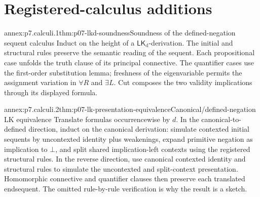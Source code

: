 
\section{Registered-calculus additions}

\begin{annexitem}{annex:p7.calculi.1}{thm:p07-lkd-soundness}{Soundness of the defined-negation sequent calculus}
Induct on the height of a
\(\mathsf{LK}_{\mathrm d}\)-derivation.  The initial and structural rules
preserve the semantic reading of the sequent.  Each propositional case unfolds
the truth clause of its principal connective.  The quantifier cases use the
first-order substitution lemma; freshness of the eigenvariable permits the
assignment variation in \(\forall R\) and \(\exists L\).  Cut composes the
two validity implications through its displayed formula.
\end{annexitem}

\begin{annexitem}{annex:p7.calculi.2}{thm:p07-lk-presentation-equivalence}{Canonical/defined-negation LK equivalence}
Translate formulas occurrencewise by \(d\).  In the canonical-to-defined
direction, induct on the canonical derivation: simulate contexted initial
sequents by uncontexted identity plus weakenings, expand primitive negation as
implication to \(\bot\), and split shared implication-left contexts using the
registered structural rules.  In the reverse direction, use canonical
contexted identity and structural rules to simulate the uncontexted and
split-context presentation.  Homomorphic connective and quantifier clauses
then preserve each translated endsequent.  The omitted rule-by-rule
verification is why the result is a sketch.
\end{annexitem}

